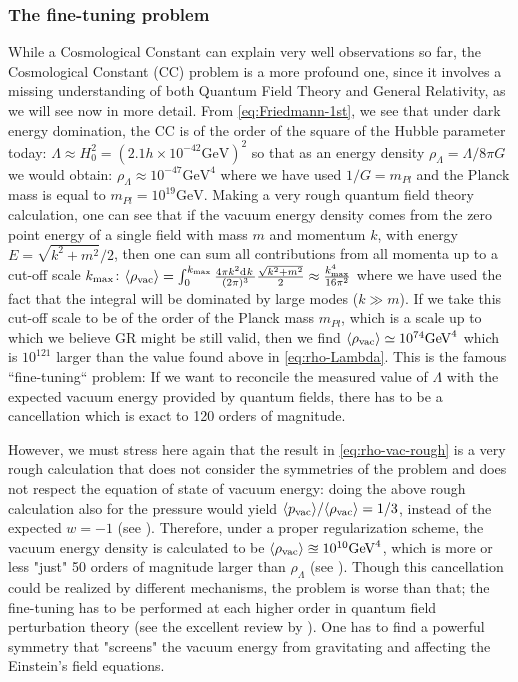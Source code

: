 \subsubsection*{The fine-tuning problem}
While a Cosmological Constant can explain very well observations so far, the Cosmological Constant (CC) problem is a more profound one, since it 
involves a missing understanding of both Quantum Field Theory and General Relativity, as we will see now in more detail.
From \cref{eq:Friedmann-1st}, we see that under dark energy domination, 
the CC is of the order of the square of the Hubble parameter today:
\beeqp$
\Lambda \approx H_0^2 = (2.1 h \times 10^{-42} \mathrm{GeV})^2
$
so that as an energy density $\rho_{\Lambda} = \Lambda / 8\pi G$ we would obtain:
\beeqc$\label{eq:rho-Lambda}
\rho_{\Lambda} \approx 10^{-47} \mathrm{GeV}^4
$
where we have used $1/G = m_{Pl} $ and the Planck mass is equal to $m_{Pl} = 10^{19} \mathrm{GeV}$.
Making a very rough quantum field theory calculation, one can see that if the vacuum energy density comes from the zero point energy of a single field with mass $ m $ and momentum $ k $, with energy
$E = \sqrt{k^2 + m^2}/2$,
then one can sum all contributions from all momenta up to a cut-off scale $k_{\rm max}$:
\beeqc
 $\langle \rho_{\rm vac} \rangle = \int_{0}^{k_{\rm max}} \frac{4\pi k^2 \mathrm{d}^{} {k} \,}{(2\pi)^3}\frac{\sqrt{k^2 + m^2}}{2} \approx \frac{k_{\rm max}^4}{16 \pi ^2} 
$
where we have used the fact that the integral will be dominated by large modes ($k \gg m$).
If we take this cut-off scale to be of the order of the Planck mass $m_{Pl}$, which is a scale up to which we believe GR might be still valid, then we find
\beeqc$\label{eq:rho-vac-rough}
\langle \rho_{\rm vac} \rangle \simeq 10^{74} \mathrm{GeV}^4
$
which is $10^121$ larger than the value found above in \cref{eq:rho-Lambda}.
This is the famous ``fine-tuning`` problem: If we want to reconcile the measured 
value of $\Lambda$ with the expected vacuum energy provided by quantum fields, 
there has to be a cancellation which is exact to 120 orders of magnitude.

However, we must stress here again that the result in \cref{eq:rho-vac-rough} 
is a very rough calculation
that does not consider the symmetries of the problem and does not respect the equation of state
of vacuum energy: doing the above rough calculation also for the pressure 
would yield $\langle p_{\rm vac} \rangle / \langle \rho_{\rm vac} \rangle  = 1/3$, instead of the expected $w=-1$ (see ).
Therefore, under a proper regularization scheme, the vacuum energy density is calculated to be 
$\langle \rho_{\rm vac} \rangle \approxeq 10^{10} \mathrm{GeV}^4$, which is more or less "just"
50 orders of magnitude larger than $\rho_{\Lambda}$ (see ).
Though this cancellation could be realized by different mechanisms, the problem is worse than that;
the fine-tuning has to be performed at each higher order in quantum field perturbation theory (see the excellent review by ). One has to find a powerful symmetry that
"screens" the vacuum energy from gravitating and affecting the Einstein's field equations.

